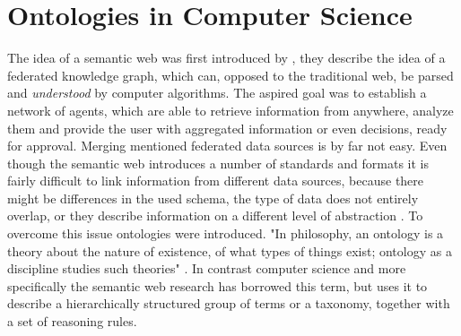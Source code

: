 \section{Ontologies in Computer Science}
	The idea of a semantic web was first introduced by \citealt{Berners-Lee2001}, they describe the idea of a federated knowledge graph, which can, opposed to the traditional web, be parsed and \emph{understood} by computer algorithms. The aspired goal was to establish a network of agents, which are able to retrieve information from anywhere, analyze them and provide the user with 
	aggregated information or even decisions, ready for approval.
	Merging mentioned federated data sources is by far not easy. Even though the semantic web introduces a number of standards and formats it is fairly difficult to link information from different data sources, because there might be differences in the used schema, the type of data does not entirely overlap, or they describe information on a different level of abstraction \citep{Berners-Lee2001}.
	To overcome this issue ontologies were introduced. "In philosophy, an ontology is a theory about the nature of existence, of what types of things exist; ontology as a discipline studies such theories" \citep{Berners-Lee2001}.
	In contrast computer science and more specifically the semantic web research has borrowed this term, but uses it to describe a hierarchically structured group of terms or a taxonomy, together with a set of reasoning rules.
	
